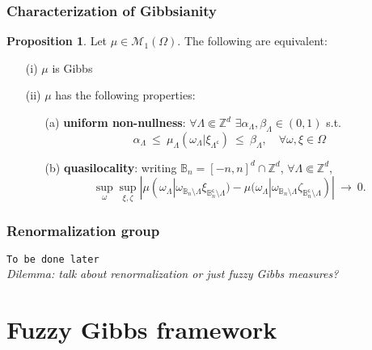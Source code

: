 \documentclass{beamer}
\newcommand{\BBB}{\mathbb{B}}
\renewcommand{\c}{\mathsf{c}}
\newcommand{\M}{\mathcal{M}}
\newcommand{\Z}{\mathbb{Z}}
\newcommand{\ra}{\rightarrow}
\newcommand{\1}{\mathbbm{1}}
\renewcommand{\c}{\mathsf{c}}
\newcommand{\5}{\vspace{0.5cm}}
\newcommand{\3}{\vspace{0.3cm}}
\theoremstyle{definition}
\newtheorem{prop}[thm]{Proposition}
\begin{document}
\begin{frame}
\frametitle{Characterization of Gibbsianity}
\begin{prop}
Let $\mu\in\M_1(\Omega)$. The following are equivalent:
	\begin{itemize}
		\item[(i)] $\mu$ is Gibbs
		\item[(ii)] $\mu$ has the following properties:
		\begin{itemize}
			\item[(a)] \textbf{uniform non-nullness}: $\forall\Lambda\Subset\Z^d$ $\exists \alpha_\Lambda,\beta_\Lambda\in(0,1)$ s.t.
			$$\alpha_\Lambda ~\leq~ \mu_\Lambda(\omega_\Lambda|\xi_{\Lambda^\c}) ~\leq~ \beta_\Lambda, \quad \forall \omega,\xi\in\Omega$$
			\item[(b)] \textbf{quasilocality}: writing $\BBB_n=[-n,n]^d\cap\Z^d$, $\forall \Lambda\Subset\Z^d$,
			$$\sup_{\omega}\sup_{\xi,\zeta}|\mu(\omega_\Lambda|\omega_{\BBB_n\setminus\Lambda}\xi_{\BBB_n^\c\setminus\Lambda})-\mu(\omega_\Lambda|\omega_{\BBB_n\setminus\Lambda}\zeta_{\BBB_n^\c\setminus\Lambda})| ~\ra~ 0.$$ 
		\end{itemize}
	\end{itemize}
\end{prop}
\end{frame}


\begin{frame}
\frametitle{Renormalization group}
\texttt{To be done later} \\\vspace{1cm}
\textit{Dilemma: talk about renormalization or just fuzzy Gibbs measures?}
\end{frame}


\section{Fuzzy Gibbs framework}

\end{document}
